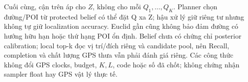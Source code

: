 Cuối cùng, cận trên áp cho $Z$, không cho mỗi $Q_1,\ldots,Q_K$. Planner
chọn đường/POI từ protected belief có thể đặt Q xa Z; hậu xử lý giữ riêng
tư nhưng không tự giữ localization accuracy. Euclid gần cũng không bảo
đảm đường có hướng hữu hạn hoặc thứ hạng POI ổn định. Belief chưa có chứng
chỉ posterior calibration; local top-k đọc vị trí/đích riêng và candidate
pool, nên Recall, completion và chất lượng GPS thưa vẫn phải đánh giá
riêng. Các công thức không đổi GPS clocks, budget, $K,L$, code hoặc số đã
chốt; không chứng nhận sampler float hay GPS vật lý thực tế.
